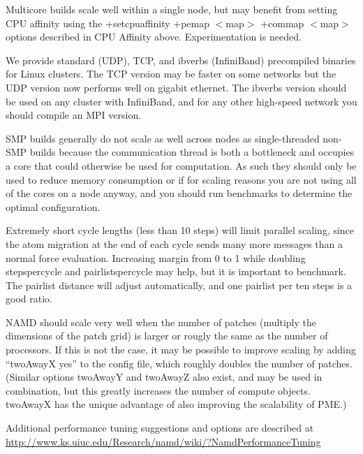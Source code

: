 Multicore builds scale well within a single node, but may benefit from
setting CPU affinity using the +setcpuaffinity +pemap $<$map$>$ +commap $<$map$>$
options described in CPU Affinity above.  Experimentation is needed.

We provide standard (UDP), TCP, and ibverbs (InfiniBand) precompiled
binaries for Linux clusters.  The TCP version may be faster on some
networks but the UDP version now performs well on gigabit ethernet.
The ibverbs version should be used on any cluster with InfiniBand,
and for any other high-speed network you should compile an MPI version.

SMP builds generally do not scale as well across nodes as single-threaded
non-SMP builds because the communication thread is both a bottleneck and
occupies a core that could otherwise be used for computation.  As such
they should only be used to reduce memory consumption or if for scaling
reasons you are not using all of the cores on a node anyway, and you
should run benchmarks to determine the optimal configuration.

Extremely short cycle lengths (less than 10 steps) will limit parallel
scaling, since the atom migration at the end of each cycle sends many
more messages than a normal force evaluation.  Increasing margin from
0 to 1 while doubling stepspercycle and pairlistspercycle may help,
but it is important to benchmark.  The pairlist distance will adjust
automatically, and one pairlist per ten steps is a good ratio.

NAMD should scale very well when the number of patches (multiply the
dimensions of the patch grid) is larger or rougly the same as the
number of processors.  If this is not the case, it may be possible
to improve scaling by adding ``twoAwayX yes'' to the config file,
which roughly doubles the number of patches.  (Similar options
twoAwayY and twoAwayZ also exist, and may be used in combination,
but this greatly increases the number of compute objects.  twoAwayX
has the unique advantage of also improving the scalability of PME.)
  

Additional performance tuning suggestions and options are described
at \url{http://www.ks.uiuc.edu/Research/namd/wiki/?NamdPerformanceTuning}

